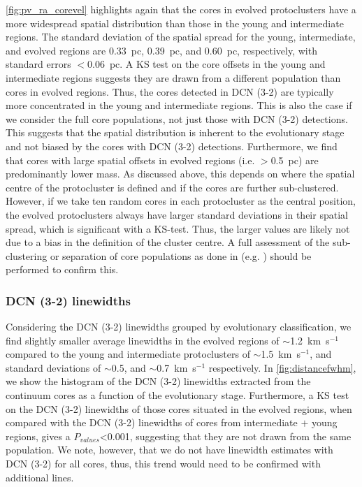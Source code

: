 \documentclass[longauth]{aa} %
\newcommand{\kms}{\textrm{km~s}\ensuremath{^{-1}}\xspace}       %
\begin{document}
\cref{fig:pv_ra_corevel} highlights again that the cores in evolved protoclusters have a more widespread spatial distribution than those in the young and intermediate regions. The standard deviation of the spatial spread for the young, intermediate, and evolved regions are 0.33~pc, 0.39~pc, and 0.60~pc, respectively, with standard errors $<$0.06~pc. A KS test on the core offsets in the young and intermediate regions suggests they are drawn from a different population than cores in evolved regions. Thus, the cores detected in DCN (3-2) are typically more concentrated in the young and intermediate regions. This is also the case if we consider the full core populations, not just those with DCN (3-2) detections. This suggests that the spatial distribution is inherent to the evolutionary stage and not biased by the cores with DCN (3-2) detections. %
Furthermore, we find that cores with large spatial offsets in evolved regions (i.e. $>$0.5~pc) are predominantly lower mass. As discussed above, this depends on where the spatial centre of the protocluster is defined and if the cores are further sub-clustered. However, if we take ten random cores in each protocluster as the central position, the evolved protoclusters always have larger standard deviations in their spatial spread, which is significant with a KS-test. Thus, the larger values are likely not due to a bias in the definition of the cluster centre. A full assessment of the sub-clustering or separation of core populations as done in (e.g. \citealt{Pouteau23}) should be performed to confirm this.

\subsubsection{DCN (3-2) linewidths}

Considering the DCN (3-2) linewidths grouped by evolutionary classification, we find slightly smaller average linewidths in the evolved regions of $\sim$1.2~\kms compared to the young and intermediate protoclusters of $\sim$1.5~\kms, and standard deviations of $\sim$0.5, and $\sim$0.7~\kms respectively. In \cref{fig:distancefwhm}, we show the histogram of the DCN (3-2) linewidths extracted from the continuum cores as a function of the evolutionary stage. 
Furthermore, a KS test on the DCN (3-2) linewidths of those cores situated in the evolved regions, when compared with the DCN (3-2) linewidths of cores from intermediate $+$ young regions, gives a $P_{values}$<0.001, suggesting that they are not drawn from the same population. We note, however, that we do not have linewidth estimates with DCN (3-2) for all cores, thus, this trend would need to be confirmed with additional lines.
\end{document}
